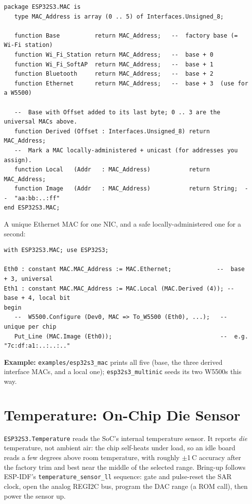 \begin{lstlisting}
package ESP32S3.MAC is
   type MAC_Address is array (0 .. 5) of Interfaces.Unsigned_8;

   function Base          return MAC_Address;   --  factory base (= Wi-Fi station)
   function Wi_Fi_Station return MAC_Address;   --  base + 0
   function Wi_Fi_SoftAP  return MAC_Address;   --  base + 1
   function Bluetooth     return MAC_Address;   --  base + 2
   function Ethernet      return MAC_Address;   --  base + 3  (use for a W5500)

   --  Base with Offset added to its last byte; 0 .. 3 are the universal MACs above.
   function Derived (Offset : Interfaces.Unsigned_8) return MAC_Address;
   --  Mark a MAC locally-administered + unicast (for addresses you assign).
   function Local   (Addr   : MAC_Address)           return MAC_Address;
   function Image   (Addr   : MAC_Address)           return String;  --  "aa:bb:..:ff"
end ESP32S3.MAC;
\end{lstlisting}

A unique Ethernet MAC for one NIC, and a safe locally-administered one for a second:

\begin{lstlisting}
with ESP32S3.MAC; use ESP32S3;

Eth0 : constant MAC.MAC_Address := MAC.Ethernet;             --  base + 3, universal
Eth1 : constant MAC.MAC_Address := MAC.Local (MAC.Derived (4)); -- base + 4, local bit
begin
   --  W5500.Configure (Dev0, MAC => To_W5500 (Eth0), ...);   --  unique per chip
   Put_Line (MAC.Image (Eth0));                               --  e.g. "7c:df:a1:..:..:.."
\end{lstlisting}

\noindent\textbf{Example:} \texttt{examples/esp32s3\_mac} prints all five (base, the
three derived interface MACs, and a local one); \texttt{esp32s3\_multinic} seeds its
two W5500s this way.

\section{Temperature: On-Chip Die Sensor}
\label{app:int:temperature}

\texttt{ESP32S3.Temperature} reads the SoC's internal temperature sensor. It
reports \emph{die} temperature, not ambient air: the chip self-heats under load,
so an idle board reads a few degrees above room temperature, with roughly
$\pm$1\,\textdegree C accuracy after the factory trim and best near the middle of
the selected range. Bring-up follows ESP-IDF's \texttt{temperature\_sensor\_ll}
sequence: gate and pulse-reset the SAR clock, open the analog REGI2C bus,
program the DAC range (a ROM call), then power the sensor up.

